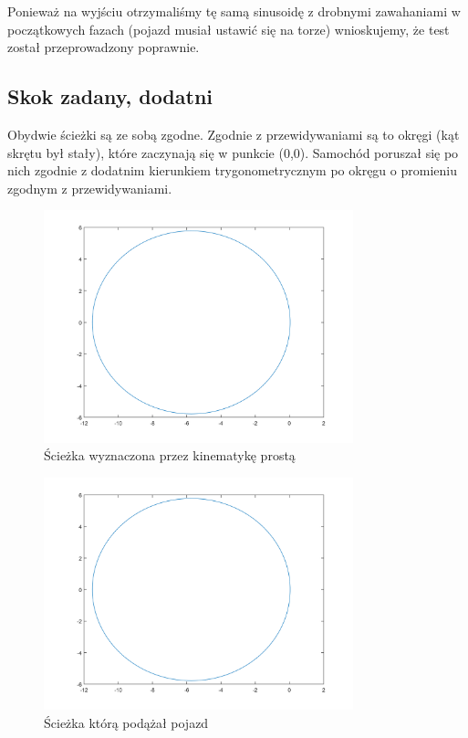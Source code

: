 \documentclass[a4paper, 12pt]{report}
\begin{document}
				\noindent Ponieważ na wyjściu otrzymaliśmy tę samą sinusoidę z drobnymi zawahaniami w początkowych fazach (pojazd musiał ustawić się na torze) wnioskujemy, że test został przeprowadzony poprawnie.
			\newpage
			\subsection{Skok zadany, dodatni}
				Obydwie ścieżki są ze sobą zgodne. Zgodnie z przewidywaniami są to okręgi (kąt skrętu był stały), które zaczynają się w punkcie (0,0). Samochód poruszał się po nich zgodnie z dodatnim kierunkiem trygonometrycznym po okręgu o promieniu zgodnym z przewidywaniami.
				\begin{figure}[H]
					\centering
					\includegraphics[width = 0.8\textwidth]{./AP/img/step_1_in_1.png}
					\caption{Ścieżka wyznaczona przez kinematykę prostą}
				\end{figure}
				\begin{figure}[H]
					\centering
					\includegraphics[width = 0.8\textwidth]{./AP/img/step_1_in_2.png}
					\caption{Ścieżka którą podążał pojazd}
				\end{figure}
\end{document}
